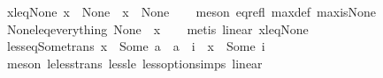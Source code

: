 \begin{isabellebody}
\isanewline
%
\endisadelimproof
\isanewline
{}\isamarkupfalse%
\ x{\isacharunderscore}leq{\isacharunderscore}None{\isacharcolon}\ {\isachardoublequoteopen}{\isacharparenleft}x\ {\isasymle}\ None{\isacharparenright}\ {\isacharequal}\ {\isacharparenleft}x\ {\isacharequal}\ None{\isacharparenright}{\isachardoublequoteclose}\isanewline
%
\isadelimproof
\ \ %
\endisadelimproof
%
\isatagproof
{}\isamarkupfalse%
\ {\isacharparenleft}meson\ eq{\isacharunderscore}refl\ max{\isacharunderscore}def\ max{\isacharunderscore}is{\isacharunderscore}None{\isacharparenright}%
\endisatagproof
{\isafoldproof}%
%
\isadelimproof
\isanewline
%
\endisadelimproof
\isanewline
{}\isamarkupfalse%
\ None{\isacharunderscore}leq{\isacharunderscore}everything{\isacharcolon}\ {\isachardoublequoteopen}None\ {\isasymle}\ x{\isachardoublequoteclose}\isanewline
%
\isadelimproof
\ \ %
\endisadelimproof
%
\isatagproof
{}\isamarkupfalse%
\ {\isacharparenleft}metis\ linear\ x{\isacharunderscore}leq{\isacharunderscore}None{\isacharparenright}%
\endisatagproof
{\isafoldproof}%
%
\isadelimproof
\isanewline
%
\endisadelimproof
\isanewline
{}\isamarkupfalse%
\ less{\isacharunderscore}eq{\isacharunderscore}Some{\isacharunderscore}trans{\isacharcolon}\ {\isachardoublequoteopen}x\ {\isacharless}\ Some\ a\ {\isasymLongrightarrow}\ a\ {\isasymle}\ i\ {\isasymLongrightarrow}\ x\ {\isasymle}\ Some\ i{\isachardoublequoteclose}\isanewline
%
\isadelimproof
\ \ %
\endisadelimproof
%
\isatagproof
{}\isamarkupfalse%
\ {\isacharparenleft}meson\ le{\isacharunderscore}less{\isacharunderscore}trans\ less{\isacharunderscore}le\ less{\isacharunderscore}option{\isachardot}simps{\isacharparenleft}{}{\isacharparenright}\ linear{\isacharparenright}%
\endisatagproof
{\isafoldproof}%
%
\isadelimproof
\isanewline
%
\endisadelimproof
%
\isadelimtheory
\isanewline
%
\endisadelimtheory
%
\isatagtheory
{}\isamarkupfalse%
%
\endisatagtheory
{\isafoldtheory}%
%
\isadelimtheory
%
\endisadelimtheory
%
\end{isabellebody}%
\endinput
